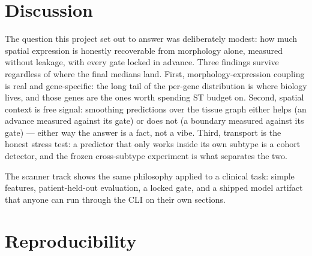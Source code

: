 \documentclass[11pt]{article}
\begin{document}
\section{Discussion}
The question this project set out to answer was deliberately modest: how much spatial
expression is honestly recoverable from morphology alone, measured without leakage,
with every gate locked in advance. Three findings survive regardless of where the
final medians land. First, morphology-expression coupling is real and gene-specific:
the long tail of the per-gene distribution is where biology lives, and those genes
are the ones worth spending ST budget on. Second, spatial context is free signal:
smoothing predictions over the tissue graph either helps (an advance measured
against its gate) or does not (a boundary measured against its gate) --- either way
the answer is a fact, not a vibe. Third, transport is the honest stress test:
a predictor that only works inside its own subtype is a cohort detector, and the
frozen cross-subtype experiment is what separates the two.

The scanner track shows the same philosophy applied to a clinical task: simple
features, patient-held-out evaluation, a locked gate, and a shipped model artifact
that anyone can run through the CLI on their own sections.

\section{Reproducibility}
\end{document}
